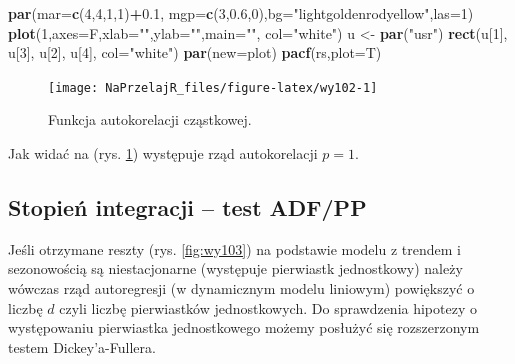 \documentclass[polish,]{book}
\newenvironment{Shaded}{\begin{snugshade}}{\end{snugshade}}
\newcommand{\DataTypeTok}[1]{\textcolor[rgb]{0.13,0.29,0.53}{#1}}
\newcommand{\DecValTok}[1]{\textcolor[rgb]{0.00,0.00,0.81}{#1}}
\newcommand{\FloatTok}[1]{\textcolor[rgb]{0.00,0.00,0.81}{#1}}
\newcommand{\KeywordTok}[1]{\textcolor[rgb]{0.13,0.29,0.53}{\textbf{#1}}}
\newcommand{\NormalTok}[1]{#1}
\newcommand{\OperatorTok}[1]{\textcolor[rgb]{0.81,0.36,0.00}{\textbf{#1}}}
\newcommand{\StringTok}[1]{\textcolor[rgb]{0.31,0.60,0.02}{#1}}
\begin{document}
\begin{Shaded}
\begin{Highlighting}[]
\KeywordTok{par}\NormalTok{(}\DataTypeTok{mar=}\KeywordTok{c}\NormalTok{(}\DecValTok{4}\NormalTok{,}\DecValTok{4}\NormalTok{,}\DecValTok{1}\NormalTok{,}\DecValTok{1}\NormalTok{)}\OperatorTok{+}\FloatTok{0.1}\NormalTok{, }\DataTypeTok{mgp=}\KeywordTok{c}\NormalTok{(}\DecValTok{3}\NormalTok{,}\FloatTok{0.6}\NormalTok{,}\DecValTok{0}\NormalTok{),}\DataTypeTok{bg=}\StringTok{"lightgoldenrodyellow"}\NormalTok{,}\DataTypeTok{las=}\DecValTok{1}\NormalTok{)}
\KeywordTok{plot}\NormalTok{(}\DecValTok{1}\NormalTok{,}\DataTypeTok{axes=}\NormalTok{F,}\DataTypeTok{xlab=}\StringTok{""}\NormalTok{,}\DataTypeTok{ylab=}\StringTok{""}\NormalTok{,}\DataTypeTok{main=}\StringTok{""}\NormalTok{, }\DataTypeTok{col=}\StringTok{"white"}\NormalTok{)}
\NormalTok{u <-}\StringTok{ }\KeywordTok{par}\NormalTok{(}\StringTok{"usr"}\NormalTok{)}
\KeywordTok{rect}\NormalTok{(u[}\DecValTok{1}\NormalTok{], u[}\DecValTok{3}\NormalTok{], u[}\DecValTok{2}\NormalTok{], u[}\DecValTok{4}\NormalTok{], }\DataTypeTok{col=}\StringTok{"white"}\NormalTok{)}
\KeywordTok{par}\NormalTok{(}\DataTypeTok{new=}\NormalTok{plot)}
\KeywordTok{pacf}\NormalTok{(rs,}\DataTypeTok{plot=}\NormalTok{T)}
\end{Highlighting}
\end{Shaded}

\begin{figure}[h]

{\centering \texttt{[image: NaPrzelajR\_files/figure-latex/wy102-1]} 

}

\caption{Funkcja autokorelacji cząstkowej.}\label{fig:wy102}
\end{figure}

Jak widać na (rys. \ref{fig:wy102}) występuje rząd autokorelacji \(p = 1\).

\hypertarget{part_10.2.4}{%
\subsection{Stopień integracji -- test ADF/PP}\label{part_10.2.4}}

Jeśli otrzymane reszty (rys. \ref{fig:wy103}) na podstawie modelu z trendem i sezonowością są niestacjonarne (występuje pierwiastk jednostkowy) należy wówczas rząd
autoregresji (w dynamicznym modelu liniowym) powiększyć o liczbę \(d\) czyli liczbę
pierwiastków jednostkowych. Do sprawdzenia hipotezy o występowaniu pierwiastka
jednostkowego możemy posłużyć się rozszerzonym testem Dickey'a-Fullera.
\end{document}
